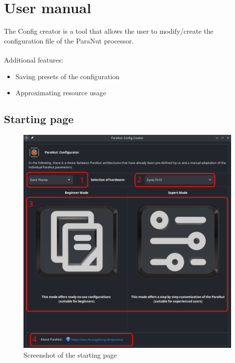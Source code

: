 


	\sloppy
	
		
\chapter{User manual}
The Config creator is a tool that allows the user to modify/create the configuration
file of the ParaNut processor.\\\\
Additional features:
\begin{itemize}
	\item Saving presets of the configuration
	\item Approximating resource usage
\end{itemize}

\section{Starting page}

\begin{figure}[!h]
    \noindent \begin{centering}
        \includegraphics[width=15cm]{images/start_page}
        \par\end{centering}
    \caption{Screenshot of the starting page}
\end{figure}

